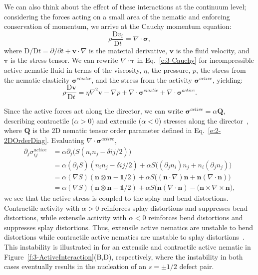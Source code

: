 We can also think about the effect of these interactions at the continuum level; considering the forces acting on a small area of the nematic and enforcing conservation of momentum, we arrive at the Cauchy momentum equation:
\begin{equation}
  \rho \frac{\textrm{D} v_i}{\textrm{D}t } = \nabla \cdot \bm{\sigma},\label{e:3-Cauchy}
\end{equation}
where $\textrm{D}/\textrm{D}t = \partial/\partial t + \mathbf{v} \cdot \nabla$ is the material derivative, $\mathbf{v}$ is the fluid velocity, and $\bm{\tau}$ is the stress tensor.
We can rewrite $\nabla \cdot \bm{\tau}$ in Eq.~\ref{e:3-Cauchy} for incompressible active nematic fluid in terms of the viscosity, $\eta$, the pressure, $p$, the stress from the nematic elasticity $\bm{\sigma}^{elastic}$, and the stress from the activity $\bm{\sigma}^{active}$, yielding:
\begin{equation}
  \rho \frac{\textrm{D} \mathbf{v}}{\textrm{D}t } = \eta \nabla^2 \mathbf{v} - \nabla p + \nabla \cdot \bm{\sigma}^{elastic} + \nabla \cdot \bm{\sigma}^{active}.\label{e:3-NavierStokes}
\end{equation}

Since the active forces act along the director, we can write $\bm{\sigma}^{active} = \alpha \mathbf{Q}$, describing contractile ($\alpha > 0$) and extensile ($\alpha < 0$) stresses along the director~\cite{RN11}, where $\mathbf{Q}$ is the 2D nematic tensor order parameter defined in Eq.~\ref{e:2-2DOrderDiag}.
Evaluating $\nabla \cdot \bm{\sigma}^{active}$,
\begin{align}
  \partial_j \sigma^{active}_{ij} &= \alpha \partial_j \big(S(n_in_j - \delta{ij}/2)\big)\label{e:3-ActiveInstabilityA} \\
  &= \alpha(\partial_j S)(n_in_j - \delta{ij}/2) + \alpha S \big((\partial_j n_i)n_j + n_i(\partial_j n_j) \big) \\
  &= \alpha (\nabla S)(\mathbf{n} \otimes \mathbf{n}-\mathbb{1}/2) + \alpha S \big((\mathbf{n} \cdot \nabla)\mathbf{n} + \mathbf{n}(\nabla \cdot \mathbf{n}) \big) \\
  &=  \alpha (\nabla S)(\mathbf{n} \otimes \mathbf{n}-\mathbb{1}/2) + \alpha S \big(\mathbf{n}(\nabla \cdot \mathbf{n}) - (\mathbf{n} \times \nabla \times \mathbf{n}  \big),\label{e:3-ActiveInstabilityD}
\end{align}
we see that the active stress is coupled to the splay and bend distortions.
Contractile activity with $\alpha > 0$ reinforces splay distortions and suppresses bend distortions, while extensile activity with $\alpha < 0$ reinforces bend distortions and suppresses splay distortions.
Thus, extensile active nematics are unstable to bend distortions while contractile active nematics are unstable to splay distortions~\cite{RN171,RN170,RN11}.
This instability is illustrated in for an extensile and contractile active nematic in Figure~\ref{f:3-ActiveInteraction}(B,D), respectively, where the instability in both cases eventually results in the nucleation of an $s=\pm 1/2$ defect pair.

